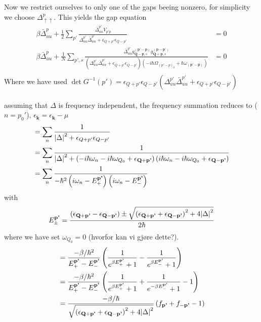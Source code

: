 \documentclass{article}
\begin{document}
Now we restrict ourselves to only one of the gaps beeing nonzero, for simplicity we choose $\Delta_{\uparrow \uparrow}^{p}$. This yields the gap equation
\begin{align}
    \beta{\bar{\Delta}}_{uu}^{p} + \frac{1}{2} \sum_{p'} \frac{\bar{\Delta}_{uu}^{p'}  V_{p'p}}{\Delta_{uu}^{p'} \bar{\Delta}_{uu}^{p'} + \epsilon_{Q+p'} \epsilon_{Q-p'}}  &= 0\nonumber\\
    \beta{\bar{\Delta}}_{uu}^{p} + \frac{1}{N} \sum_{p',s} \frac{\bar{\Delta}_{uu}^{p'} g_{\textbf{Q} - \textbf{p},s}^{(\textbf{p'} - \textbf{p})} g_{\textbf{Q} + \textbf{p},s}^{(\textbf{p} - \textbf{p'})}}{\left(\Delta_{uu}^{p'} \bar{\Delta}_{uu}^{p'} + \epsilon_{Q+p'} \epsilon_{Q-p'}\right) \left(-i\hbar\Omega_{(p'-p)_0} + \hbar \omega_{(\textbf{p'} - \textbf{p})}\right)}  &= 0\nonumber \\
\end{align}
Where we have used $\det{G^{-1}}(p') = \epsilon_{Q+p'} \epsilon_{Q-p'} \left( \Delta^{p'}_{uu} \bar{\Delta}^{p'}_{uu} + \epsilon_{Q+p'} \epsilon_{Q-p'}\right)$
\\
\\
assuming that $\Delta$ is frequency independent, the frequency summation reduces to ($n = p_0'$), $\epsilon_{\textbf{k}} = \epsilon_{\textbf{k}} - \mu$
\begin{align}
         &=  \sum_{n} \frac{1}{\abs{\Delta}^2 + \epsilon_{Q+p'} \epsilon_{Q-p'}} \nonumber \\
         &=  \sum_{n} \frac{1}{\abs{\Delta}^2 + \left(-i\hbar\omega_n - i \hbar \omega_{Q_0} + \epsilon_{\textbf{Q} + \textbf{p'}}\right) \left(i\hbar\omega_n - i \hbar \omega_{Q_0} + \epsilon_{\textbf{Q} - \textbf{p'}}\right)} \nonumber \\
         &= \sum_{n} \frac{1}{-\hbar^2\left(i\omega_n - E_+^{\textbf{p'}}\right)\left(i\omega_n - E_-^{\textbf{p'}}\right)} \nonumber\\
\end{align}
with 
\begin{equation}
        E_{\pm}^{\textbf{p'}} = \frac{\left(\epsilon_{\textbf{Q} + \textbf{p'}} - \epsilon_{\textbf{Q} - \textbf{p'}}\right) \pm \sqrt{\left(\epsilon_{\textbf{Q} + \textbf{p'}} + \epsilon_{\textbf{Q} - \textbf{p'}}\right)^2 + 4 \abs{\Delta}^2 } }{2\hbar}
\end{equation} 
where we have set $\omega_{Q_0} = 0$ (hvorfor kan vi gjøre dette?).
\begin{align}
         &=  \frac{-\beta / \hbar^2}{E_+^{\textbf{p'}} - E_-^{\textbf{p'}}}\left(\frac{1}{e^{\beta E_+^{\textbf{p'}}} + 1} - \frac{1}{e^{\beta E_-^{\textbf{p'}}} + 1}\right)\nonumber\\
         &=  \frac{-\beta / \hbar^2}{E_+^{\textbf{p'}} - E_-^{\textbf{p'}}}\left(\frac{1}{e^{\beta E_+^{\textbf{p'}}} + 1} + \frac{1}{e^{-\beta E_-^{\textbf{p'}}} + 1} - 1\right)\nonumber\\
         &=  \frac{-\beta / \hbar}{\sqrt{\left(\epsilon_{\textbf{Q} + \textbf{p'}} + \epsilon_{\textbf{Q} - \textbf{p'}}\right)^2 + 4 \abs{\Delta}^2 }}\left(f_{\textbf{p'}} + f_{-\textbf{p'}} - 1\right)\nonumber\\
\end{align}
\end{document}
